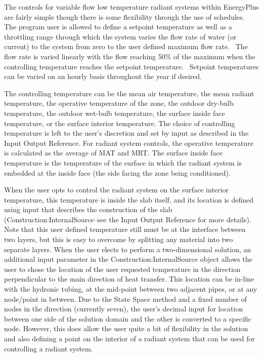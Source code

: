 The controls for variable flow low temperature radiant systems within EnergyPlus are fairly simple though there is some flexibility through the use of schedules.~ The program user is allowed to define a setpoint temperature as well as a throttling range through which the system varies the flow rate of water (or current) to the system from zero to the user defined maximum flow rate.~ The flow rate is varied linearly with the flow reaching 50\% of the maximum when the controlling temperature reaches the setpoint temperature.~ Setpoint temperatures can be varied on an hourly basis throughout the year if desired.

The controlling temperature can be the mean air temperature, the mean radiant temperature, the operative temperature of the zone, the outdoor dry-bulb temperature, the outdoor wet-bulb temperature, the surface inside face temperature, or the surface interior temperature.  The choice of controlling temperature is left to the user's discretion and set by input as described in the Input Output Reference.  For radiant system controls, the operative temperature is calculated as the average of MAT and MRT.  The surface inside face temperature is the temperature of the surface in which the radiant system is embedded at the inside face (the side facing the zone being conditioned).

When the user opts to control the radiant system on the surface interior temperature, this temperature is inside the slab itself, and its location is defined using input that describes the construction of the slab (Construction:InternalSource--see the Input Output Reference for more details).  Note that this user defined temperature still must be at the interface between two layers, but this is easy to overcome by splitting any material into two separate layers.  When the user elects to perform a two-dimensional solution, an additional input parameter in the Construction:InternalSource object allows the user to chose the location of the user requested temperature in the direction perpendicular to the main direction of heat transfer.  This location can be in-line with the hydronic tubing, at the mid-point between two adjacent pipes, or at any node/point in between.  Due to the State Space method and a fixed number of nodes in the direction (currently seven), the user's decimal input for location between one side of the solution domain and the other is converted to a specific node.  However, this does allow the user quite a bit of flexibility in the solution and also defining a point on the interior of a radiant system that can be used for controlling a radiant system.


